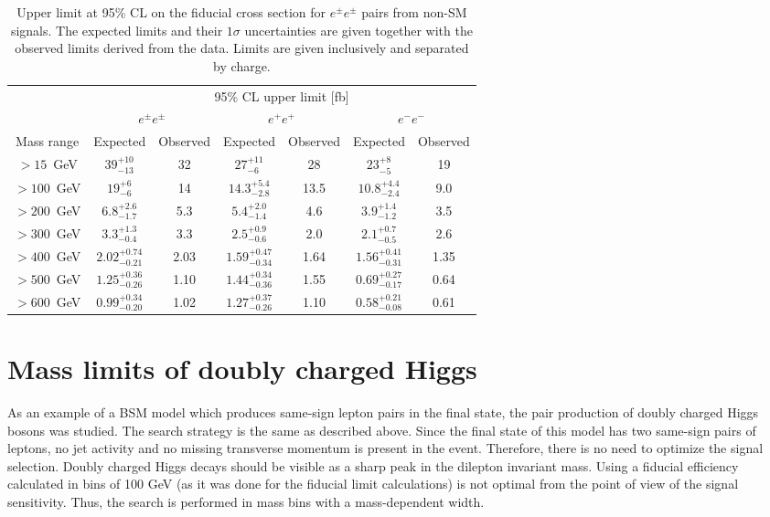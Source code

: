 \begin{table*}[!ht]
\begin{center}
\begin{tabular}{c||c|c||c|c||c|c}

 & \multicolumn{6}{c}{95\%  CL upper limit [fb]} \\
 & \multicolumn{2}{c||}{$e^{\pm}e^{\pm}$} & \multicolumn{2}{c||}{$e^{+}e^{+}$} & \multicolumn{2}{c}{$e^{-}e^{-}$} \\
Mass range & Expected & Observed & Expected & Observed & Expected & Observed \\
\hline
\rule{0pt}{3ex}
  $>15$~GeV   &  $39^{+10}_{-13}$        &  32    &    $27^{+11}_{-6}$         &  28    &    $23^{+8}_{-5}$          &  19\\
  $>100$~GeV  &  $19^{+6}_{-6}$          &  14    &    $14.3^{+5.4}_{-2.8}$    &  13.5  &    $10.8^{+4.4}_{-2.4}$    &  9.0\\
  $>200$~GeV  &  $6.8^{+2.6}_{-1.7}$     &  5.3   &    $5.4^{+2.0}_{-1.4}$     &  4.6   &    $3.9^{+1.4}_{-1.2}$     &  3.5\\
  $>300$~GeV  &  $3.3^{+1.3}_{-0.4}$     &  3.3   &    $2.5^{+0.9}_{-0.6}$     &  2.0   &    $2.1^{+0.7}_{-0.5}$     &  2.6\\
  $>400$~GeV  &  $2.02^{+0.74}_{-0.21}$  &  2.03  &    $1.59^{+0.47}_{-0.34}$  &  1.64  &    $1.56^{+0.41}_{-0.31}$  &  1.35\\
  $>500$~GeV  &  $1.25^{+0.36}_{-0.26}$  &  1.10  &    $1.44^{+0.34}_{-0.36}$  &  1.55  &    $0.69^{+0.27}_{-0.17}$  &  0.64\\
  $>600$~GeV  &  $0.99^{+0.34}_{-0.20}$  &  1.02  &    $1.27^{+0.37}_{-0.26}$  &  1.10  &    $0.58^{+0.21}_{-0.08}$  &  0.61\\

\end{tabular}
\end{center}
 \caption{Upper limit at 95\% CL on the fiducial cross section for $e^{\pm} e^{\pm}$ pairs from non-SM signals. 
 The expected limits and their $1 \sigma$ uncertainties are given together with the observed limits derived from the data. 
 Limits are given inclusively and separated by charge.}
\label{tab:limits}
\end{table*}


\section{Mass limits of doubly charged Higgs}
As an example of a BSM model which produces same-sign lepton pairs in the final state, the pair production of doubly charged Higgs bosons was studied.
The search strategy is the same as described above.
Since the final state of this model has two same-sign pairs of leptons, no jet activity and no missing transverse momentum is present in the event.
Therefore, there is no need to optimize the signal selection.
Doubly charged Higgs decays should be visible as a sharp peak in the dilepton invariant mass.
Using a fiducial efficiency calculated in bins of 100 GeV (as it was done for the fiducial limit calculations) is not optimal from the point of view of the signal sensitivity.
Thus, the search is performed in mass bins with a mass-dependent width.

